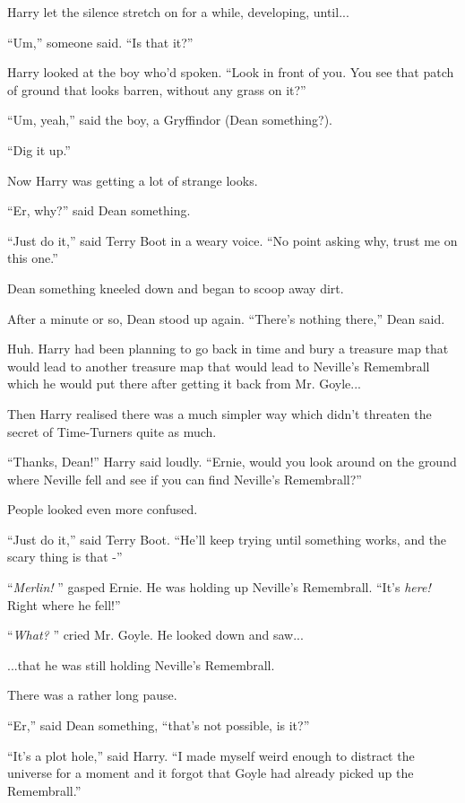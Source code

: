 Harry let the silence stretch on for a while, developing, until...

``Um,'' someone said. ``Is that it?''

Harry looked at the boy who'd spoken. ``Look in front of you. You see
that patch of ground that looks barren, without any grass on it?''

``Um, yeah,'' said the boy, a Gryffindor (Dean something?).

``Dig it up.''

Now Harry was getting a lot of strange looks.

``Er, why?'' said Dean something.

``Just do it,'' said Terry Boot in a weary voice. ``No point asking why,
trust me on this one.''

Dean something kneeled down and began to scoop away dirt.

After a minute or so, Dean stood up again. ``There's nothing there,''
Dean said.

Huh. Harry had been planning to go back in time and bury a treasure map
that would lead to another treasure map that would lead to Neville's
Remembrall which he would put there after getting it back from Mr.
Goyle...

Then Harry realised there was a much simpler way which didn't threaten
the secret of Time-Turners quite as much.

``Thanks, Dean!'' Harry said loudly. ``Ernie, would you look around on
the ground where Neville fell and see if you can find Neville's
Remembrall?''

People looked even more confused.

``Just do it,'' said Terry Boot. ``He'll keep trying until something
works, and the scary thing is that -''

``\emph{Merlin!} '' gasped Ernie. He was holding up Neville's Remembrall.
``It's \emph{here!} Right where he fell!''

``\emph{What?} '' cried Mr. Goyle. He looked down and saw...

...that he was still holding Neville's Remembrall.

There was a rather long pause.

``Er,'' said Dean something, ``that's not possible, is it?''

``It's a plot hole,'' said Harry. ``I made myself weird enough to
distract the universe for a moment and it forgot that Goyle had already
picked up the Remembrall.''

